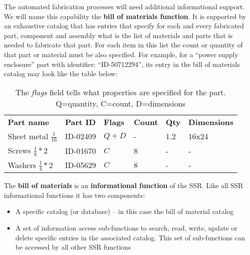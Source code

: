 \hypertarget{RefHeading3062306210128}{}The automated fabrication
processes will need additional informational support. We will name this
capability the \textbf{bill of materials function}. It is supported by
an exhaustive catalog that has entries that specify for each and every
fabricated part, component and assembly what is the list of materials
and parts that is needed to fabricate that part. For each item in this
list the count or quantity of that part or material must be also
specified. For example, for a “power supply enclosure” part with
identifier:  “ID-50712294”, its entry in the bill of materials catalog
may look like the table below:


\begin{table}[h]
\caption{Example Entries in the Bill of Materials Catalog for the ``Power Supply Enclosure'' part}
\begin{center}
\begin{tabular}{| l l l l l l |}
\hline
\textbf{Part name} &
\textbf{Part ID} &
\textbf{Flags} &
\textbf{Count} &
\textbf{Qty} &
\textbf{Dimensions}\\
Sheet metal $\frac{1}{16}$ &
ID-02409
 &
$Q + D$
 &
- &
1.2
 &
16x24
\\
Screws $\frac{1}{8}*2$ &
ID-01670
 &
$C$
 &
8 &
-
 &
-
\\
Washers $\frac{1}{4}*2$ &
ID-05629
 &
$C$
 &
8 &
-
 &
-
\\\hline
\end{tabular}
\end{center}
\caption*{The \textit{flags} field tells what properties are specified for the part.  Q=quantity, C=count, D=dimensions}
\end{table}

The \textbf{bill of materials} is an \textbf{informational function} of
the SSR. Like all SSR informational functions it has two components:

\begin{itemize}
\item A specific catalog (or database) – in this case the bill of
material catalog
\item A set of information access sub-functions to search, read, write,
update or delete specific entries in the associated catalog. This set
of sub-functions can be accessed by all other SSR functions 
\end{itemize}

